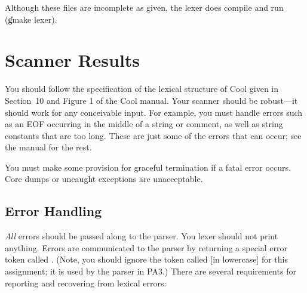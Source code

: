 \documentclass[11pt]{article}
\begin{document}
Although these files are incomplete as given, the lexer does compile
and run (\U{gmake lexer}).


\section{Scanner Results}\label{sec:results}

You should follow the specification of the lexical structure of Cool
given in Section~10 and Figure 1 of the Cool manual.  Your scanner
should be robust---it should work for any conceivable input.  For
example, you must handle errors such as an EOF occurring in the middle
of a string or comment, as well as string constants that are too long.
These are just some of the errors that can occur; see the manual for
the rest.

You must make some provision for graceful termination if a fatal error
occurs. Core dumps or uncaught exceptions are unacceptable.

\subsection{Error Handling}

\emph{All} errors should be passed along to the parser.  You lexer
should not print anything.  Errors are communicated to the parser by
returning a special error token called .  (Note, you should
ignore the token called  [in lowercase] for this assignment;
it is used by the parser in PA3.)
There are several requirements for reporting and recovering from
lexical errors:
\end{document}
